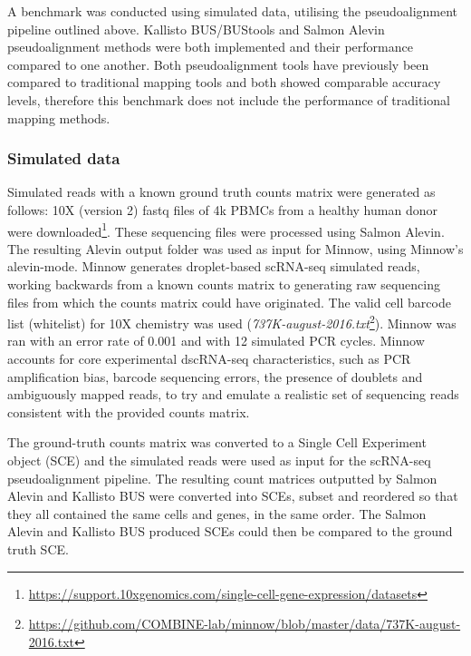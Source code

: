 A benchmark was conducted using simulated data, utilising the pseudoalignment pipeline outlined above.
Kallisto BUS/BUStools and Salmon Alevin pseudoalignment methods were both implemented and their performance compared to one another.
Both pseudoalignment tools have previously been compared to traditional mapping tools\cite{melsted2018barcode, srivastava2019alevin} and both showed comparable accuracy levels, therefore this benchmark does not include the performance of traditional mapping methods.

\subsubsection{Simulated data}
Simulated reads with a known ground truth counts matrix were generated as follows:
10X (version 2) fastq files of 4k PBMCs from a healthy human donor were downloaded\footnote{\url{https://support.10xgenomics.com/single-cell-gene-expression/datasets}}.
These sequencing files were processed using Salmon Alevin.
The resulting Alevin output folder was used as input for Minnow, using Minnow's alevin-mode.
Minnow generates droplet-based scRNA-seq simulated reads, working backwards from a known counts matrix to generating raw sequencing files from which the counts matrix could have originated.
The valid cell barcode list (whitelist) for 10X chemistry was used (\textit{737K-august-2016.txt}\footnote{\url{https://github.com/COMBINE-lab/minnow/blob/master/data/737K-august-2016.txt}}).
Minnow was ran with an error rate of 0.001 and with 12 simulated PCR cycles.
Minnow accounts for core experimental dscRNA-seq characteristics, such as PCR amplification bias, barcode sequencing errors, the presence of doublets and ambiguously mapped reads, to try and emulate a realistic set of sequencing reads consistent with the provided counts matrix.

The ground-truth counts matrix was converted to a Single Cell Experiment object (SCE) and the simulated reads were used as input for the scRNA-seq pseudoalignment pipeline.
The resulting count matrices outputted by Salmon Alevin and Kallisto BUS were converted into SCEs, subset and reordered so that they all contained the same cells and genes, in the same order.
The Salmon Alevin and Kallisto BUS produced SCEs could then be compared to the ground truth SCE.

